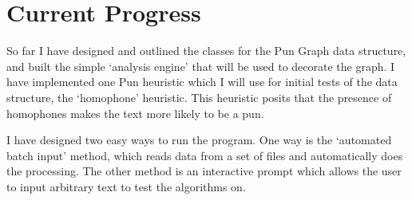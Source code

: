 \section{Current Progress}

So far I have designed and outlined the classes for the Pun Graph data structure, and built the simple `analysis engine' that will be used to decorate the graph. I have implemented one Pun heuristic which I will use for initial tests of the data structure, the `homophone' heuristic. This heuristic posits that the presence of homophones makes the text more likely to be a pun.

I have designed two easy ways to run the program. One way is the `automated batch input' method, which reads data from a set of files and automatically does the processing. The other method is an interactive prompt which allows the user to input arbitrary text to test the algorithms on.
